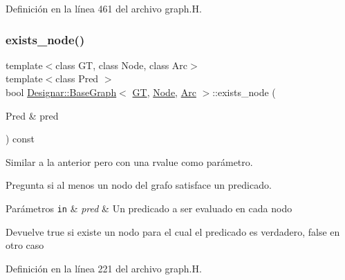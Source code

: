 Definición en la línea 461 del archivo graph.\+H.

\mbox{\label{class_designar_1_1_base_graph_a3631470de61b819211c72fdd2ac31b34}} 
\subsubsection{\texorpdfstring{exists\+\_\+node()}{exists\_node()}\hspace{0.1cm}{\footnotesize\ttfamily [1/2]}}
{\footnotesize\ttfamily template$<$class GT, class Node, class Arc$>$ \\
template$<$class Pred $>$ \\
bool \hyperlink{class_designar_1_1_base_graph}{Designar\+::\+Base\+Graph}$<$ \hyperlink{demo-buildgraph_8_c_a3001c40d2c31ca87ed96cd7d1334a55e}{GT}, \hyperlink{namespace_designar_a5af326c65aa2bd26b26c410f2030d09e}{Node}, \hyperlink{namespace_designar_a3f55fb5513d62ff47cbc8f72b8e95d6f}{Arc} $>$\+::exists\+\_\+node (\begin{DoxyParamCaption}\item[{Pred \&}]{pred }\end{DoxyParamCaption}) const\hspace{0.3cm}{\ttfamily [inline]}}



Similar a la anterior pero con una rvalue como parámetro. 

Pregunta si al menos un nodo del grafo satisface un predicado.


\begin{DoxyParams}[1]{Parámetros}
\mbox{\tt in}  & {\em pred} & Un predicado a ser evaluado en cada nodo \\
\hline
\end{DoxyParams}
\begin{DoxyReturn}{Devuelve}
{\ttfamily true} si existe un nodo para el cual el predicado es verdadero, {\ttfamily false} en otro caso 
\end{DoxyReturn}


Definición en la línea 221 del archivo graph.\+H.

\mbox{\label{class_designar_1_1_base_graph_a62df2c7ec71d2b009e96f8974968a3fc}} 
